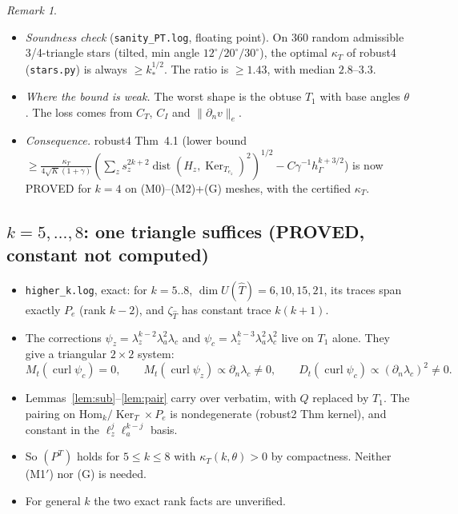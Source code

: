 \documentclass[11pt]{article}
\theoremstyle{remark}
\newtheorem{remark}[theorem]{Remark}
\newcommand{\hG}{h_\Gamma}
\begin{document}
\begin{remark}
\begin{itemize}
\item \emph{Soundness check} (\texttt{sanity\_PT.log}, floating point). On 360 random admissible 3/4-triangle stars (tilted, min angle
 $12^\circ/20^\circ/30^\circ$), the optimal $\kappa_T$ of robust4 (\texttt{stars.py}) is always $\ge k_\ast^{1/2}$. The ratio is $\ge1.43$, with median $2.8$--$3.3$.
\item \emph{Where the bound is weak.} The worst shape is the obtuse $T_1$ with base angles $\theta$. The loss comes from $C_T$, $C_I$ and $\|\partial_nv\|_e$.
\item \emph{Consequence.} robust4 Thm~4.1 (lower bound $\ge\frac{\kappa_T}{4\sqrt K(1+\gamma)}(\sum_zs_z^{2k+2}\operatorname{dist}(H_z,\operatorname{Ker}_{T_{e_z}})^2)^{1/2}-C\gamma^{-1}\hG^{k+3/2}$)
 is now PROVED for $k=4$ on (M0)--(M2)+(G) meshes, with the certified $\kappa_T$.
\end{itemize}
\end{remark}

\subsection{$k=5,\dots,8$: one triangle suffices (PROVED, constant not computed)}\label{sec:hk}
\begin{itemize}
\item \texttt{higher\_k.log}, exact: for $k=5..8$, $\dim U(\hat T)=6,10,15,21$, its traces span exactly $P_e$ (rank $k-2$), and $\zeta_{\hat T}$ has
 constant trace $k(k+1)$.
\item The corrections $\psi_z=\lambda_z^{k-2}\lambda_a^2\lambda_c$ and $\psi_c=\lambda_z^{k-3}\lambda_a^2\lambda_c^2$ live on $T_1$ alone. They give a triangular
 $2\times2$ system:
 \[
 M_t(\operatorname{curl}\psi_c)=0,\qquad M_t(\operatorname{curl}\psi_z)\propto\partial_n\lambda_c\ne0,\qquad
 D_t(\operatorname{curl}\psi_c)\propto(\partial_n\lambda_c)^2\ne0 .
 \]
\item Lemmas~\ref{lem:sub}--\ref{lem:pair} carry over verbatim, with $Q$ replaced by $T_1$. The pairing on $\mathrm{Hom}_k/\operatorname{Ker}_T\times P_e$ is
 nondegenerate (robust2 Thm kernel), and constant in the $\ell_z^j\ell_a^{k-j}$ basis.
\item So $(P^T)$ holds for $5\le k\le8$ with $\kappa_T(k,\theta)>0$ by compactness. Neither (M1$'$) nor (G) is needed.
\item For general $k$ the two exact rank facts are unverified.
\end{itemize}
\end{document}
